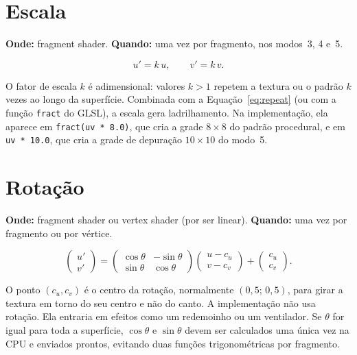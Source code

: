 \section{Escala}

\textbf{Onde:} fragment shader. \textbf{Quando:} uma vez por fragmento, nos modos~3, 4 e~5.

\begin{equation}
u'=k\,u,\qquad v'=k\,v.
\label{eq:escala}
\end{equation}

O fator de escala \(k\) é adimensional: valores \(k>1\) repetem a textura ou o padrão \(k\) vezes ao longo da superfície. Combinada com a Equação~\eqref{eq:repeat} (ou com a função \texttt{fract} do GLSL), a escala gera ladrilhamento. Na implementação, ela aparece em \texttt{fract(uv * 8.0)}, que cria a grade \(8\times8\) do padrão procedural, e em \texttt{uv * 10.0}, que cria a grade de depuração \(10\times10\) do modo~5.

\section{Rotação}

\textbf{Onde:} fragment shader ou vertex shader (por ser linear). \textbf{Quando:} uma vez por fragmento ou por vértice.

\begin{equation}
\begin{pmatrix}u'\\v'\end{pmatrix}=
\begin{pmatrix}\cos\theta & -\sin\theta\\ \sin\theta & \cos\theta\end{pmatrix}
\begin{pmatrix}u-c_u\\v-c_v\end{pmatrix}+
\begin{pmatrix}c_u\\c_v\end{pmatrix}.
\label{eq:rotacao}
\end{equation}

O ponto \((c_u,c_v)\) é o centro da rotação, normalmente \((0{,}5;\,0{,}5)\), para girar a textura em torno do seu centro e não do canto. A implementação não usa rotação. Ela entraria em efeitos como um redemoinho ou um ventilador. Se \(\theta\) for igual para toda a superfície, \(\cos\theta\) e \(\sin\theta\) devem ser calculados uma única vez na CPU e enviados prontos, evitando duas funções trigonométricas por fragmento.

